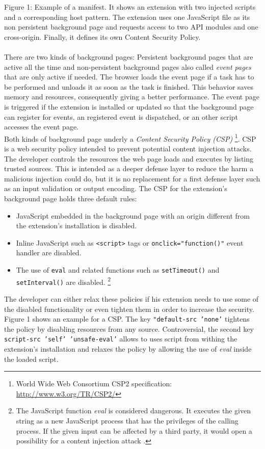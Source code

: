 \documentclass[article,colorback,accentcolor=tud9c,type=bsc]{tudthesis}
\begin{document}
	\lstset{
		numbers=left,
		xleftmargin=2em
	}
	
	
	Figure 1: Example of a manifest. It shows an extension with two injected scripts and a corresponding host pattern. The extension uses one JavaScript file as its non persistent background page and requests access to two API modules and one cross-origin. Finally, it defines its own Content Security Policy. \\ \\
	
	There are two kinds of background pages: Persistent background pages that are active all the time and non-persistent background pages also called \textit{event pages} that are only active if needed. The browser loads the event page if a task has to be performed and unloads it as soon as the task is finished. This behavior saves memory and resources, consequently giving a better performance. The event page is triggered if the extension is installed or updated so that the background page can register for events, an registered event is dispatched, or an other script accesses the event page. \\
	Both kinds of background page underly a \textit{Content Security Policy (CSP)} \footnote{World Wide Web Consortium CSP2 specification: \url{http://www.w3.org/TR/CSP2/}}. CSP is a web security policy intended to prevent potential content injection attacks. The developer controls the resources the web page loads and executes by listing trusted sources. This is intended as a deeper defense layer to reduce the harm a malicious injection could do, but it is no replacement for a first defense layer such as an input validation or output encoding. The CSP for the extension's background page holds three default rules:
	\begin{itemize}
		\itemsep0em 
		\item JavaScript embedded in the background page with an origin different from the extension's installation is disabled.
		\item Inline JavaScript such as \texttt{<script>} tags or \texttt{onclick="function()"} event handler are disabled.
		\item The use of \texttt{eval} and related functions such as \texttt{setTimeout()} and \texttt{setInterval()} are disabled.
		\footnote{The JavaScript function \textit{eval} is considered dangerous. It executes the given string as a new JavaScript process that has the privileges of the calling process. If the given input can be affected by a third party, it would open a possibility for a content injection attack \cite{mozillaDangerousEval}.}  
	\end{itemize}
	The developer can either relax these policies if his extension needs to use some of the disabled functionality or even tighten them in order to increase the security. Figure 1 shows an example for a CSP. The key \texttt{"default-src 'none'} tightens the policy by disabling resources from any source. Controversial, the second key \texttt{script-src 'self' 'unsafe-eval'} allows to uses script from withing the extension's installation and relaxes the policy by allowing the use of \textit{eval} inside the loaded script. \\
	
\end{document}
